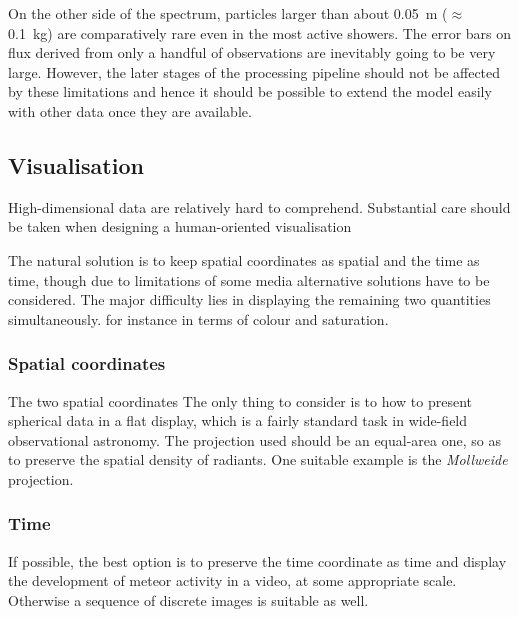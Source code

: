         On the other side of the spectrum, particles larger than about \SI{0.05}{\metre} ($\approx$ \SI{0.1}{\kilo\gram})
        are comparatively rare even in the most active showers.
        The error bars on flux derived from only a handful of observations are inevitably going to be very large.
        However, the later stages of the processing pipeline should not be affected by these limitations
        and hence it should be possible to extend the model easily with other data once they are available.

    \subsection{Visualisation} \label{iov}
        High-dimensional data are relatively hard to comprehend. Substantial care should be taken when designing
        a human-oriented visualisation


        The natural solution is to keep spatial coordinates as spatial and the time as time,
        though due to limitations of some media alternative solutions have to be considered.
        The major difficulty lies in displaying the remaining two quantities simultaneously.
        for instance in terms of colour and saturation.

        \subsubsection{Spatial coordinates} \label{iovs}
            The two spatial coordinates 
            The only thing to consider is to how to present spherical data in a flat display,
            which is a fairly standard task in wide-field observational astronomy.
            The projection used should be an equal-area one, so as to preserve the spatial density of radiants.
            One suitable example is the \emph{Mollweide} projection.


        \subsubsection{Time} \label{iovt}
            If possible, the best option is to preserve the time coordinate as time
            and display the development of meteor activity in a video, at some appropriate scale.
            Otherwise a sequence of discrete images is suitable as well.

